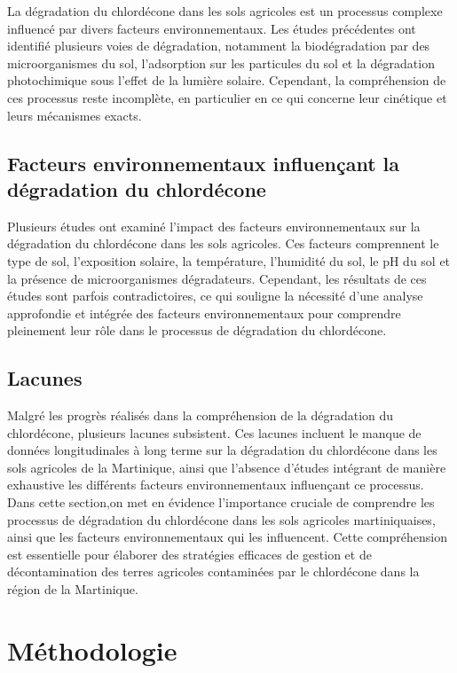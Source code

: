 \documentclass{report}
\begin{document}
La dégradation du chlordécone dans les sols agricoles est un processus complexe influencé par divers facteurs environnementaux. Les études précédentes ont identifié plusieurs voies de dégradation, notamment la biodégradation par des microorganismes du sol, l'adsorption sur les particules du sol et la dégradation photochimique sous l'effet de la lumière solaire. Cependant, la compréhension de ces processus reste incomplète, en particulier en ce qui concerne leur cinétique et leurs mécanismes exacts.

\section{Facteurs environnementaux influençant la dégradation du chlordécone}


Plusieurs études ont examiné l'impact des facteurs environnementaux sur la dégradation du chlordécone dans les sols agricoles. Ces facteurs comprennent le type de sol, l'exposition solaire, la température, l'humidité du sol, le pH du sol et la présence de microorganismes dégradateurs. Cependant, les résultats de ces études sont parfois contradictoires, ce qui souligne la nécessité d'une analyse approfondie et intégrée des facteurs environnementaux pour comprendre pleinement leur rôle dans le processus de dégradation du chlordécone.

\section{Lacunes}


Malgré les progrès réalisés dans la compréhension de la dégradation du chlordécone, plusieurs lacunes subsistent. Ces lacunes incluent le manque de données longitudinales à long terme sur la dégradation du chlordécone dans les sols agricoles de la Martinique, ainsi que l'absence d'études intégrant de manière exhaustive les différents facteurs environnementaux influençant ce processus.
\\

Dans cette section,on met en évidence l'importance cruciale de comprendre les processus de dégradation du chlordécone dans les sols agricoles martiniquaises, ainsi que les facteurs environnementaux qui les influencent. Cette compréhension est essentielle pour élaborer des stratégies efficaces de gestion et de décontamination des terres agricoles contaminées par le chlordécone dans la région de la Martinique.



\chapter*{Méthodologie}
\end{document}
